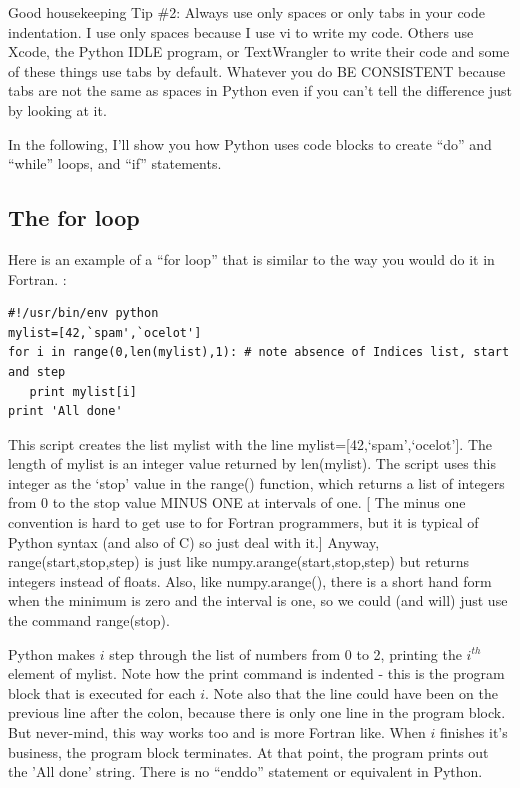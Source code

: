 \documentclass[11pt]{book}
\begin{document}
{{ \color{magenta}Good housekeeping Tip \#2: Always use only spaces or only tabs in your code indentation.  I use only spaces because I use {\color{blue}vi} to write my code.  Others use Xcode, the  Python IDLE program, or TextWrangler to write their code and some of these things use tabs by default.  Whatever you do BE CONSISTENT because tabs are not the same as spaces in Python even if you can't tell the difference just by looking at it.}




In the following, I'll show you how Python uses code blocks  to create ``do'' and ``while'' loops, and ``if'' statements.

\subsection{The for loop}

Here is an example of a ``for loop'' that is similar to the way you would do it in Fortran. :   


{ \color{blue} \begin{verbatim}
#!/usr/bin/env python
mylist=[42,`spam',`ocelot']
for i in range(0,len(mylist),1): # note absence of Indices list, start and step
   print mylist[i]
print 'All done' 
\end{verbatim}}

This script creates the list mylist with the line {\color{blue}mylist=[42,`spam',`ocelot']}.  The length of mylist is an integer value returned by {\color{blue}len(mylist)}.      The script uses this integer as the `stop' value in the  {\color{blue}range()} function,  which returns a list of integers from 0 to the stop value  MINUS ONE at intervals of one.   [ The minus one convention is hard to get use to  for Fortran programmers, but it is typical of Python syntax (and also of C) so just deal with it.]  Anyway, {\color{blue}range(start,stop,step)} is just like {\color{blue}numpy.arange(start,stop,step)} but returns integers instead of floats.  Also, like {\color{blue}numpy.arange()}, there is a short hand form when the minimum is zero and the interval is one, so we could (and will)  just use the command {\color{blue}range(stop)}. 
  
   Python makes $i$ step through the list of numbers from 0 to 2, printing the $i^{th}$ element of {\color{blue}mylist}.  Note how the print command is indented - this is the program block that is executed for each $i$.   Note also that the line could have been on the previous line after the colon, because there is only one line in the program block.  But never-mind, this way works too and is more Fortran like.   When $i$ finishes it's business, the program block terminates.   At that point, the program prints out the 'All done' string.   There is no ``enddo'' statement or equivalent in Python.  

}
\end{document}
